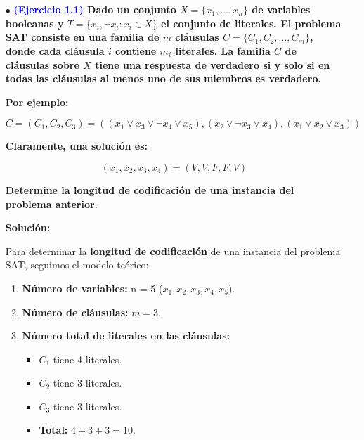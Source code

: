 \documentclass[12pt]{article}
\begin{document}
\section{}
{
    \subsection{}
    {

        \begin{enumerate}
            \item[$\bullet$]\textbf{\textcolor{blue}{(Ejercicio 1.1)} Dado un conjunto $X = \{x_1, \dots, x_n\}$ de variables booleanas y $T = \{x_i, \neg x_i : x_i \in X\}$ el conjunto de literales.  
            El problema SAT consiste en una familia de $m$ cláusulas $C = \{C_1, C_2, \dots, C_m\}$, donde cada cláusula $i$ contiene $m_i$ literales.  
            La familia $C$ de cláusulas sobre $X$ tiene una respuesta de verdadero si y solo si en todas las cláusulas al menos uno de sus miembros es verdadero.}
            
            \textbf{Por ejemplo: }

                \[
                    C = (C_1, C_2, C_3) = ((x_1 \lor x_3 \lor \neg x_4 \lor x_5), (x_2 \lor \neg x_3 \lor x_4), (x_1 \lor x_2 \lor x_3))
                \]

            \textbf{Claramente, una solución es:}
                
                \[
                (x_1, x_2, x_3, x_4) = (V, V, F, F, V)
                \]
                
            \textbf{Determine la longitud de codificación de una instancia del problema anterior.}

            \textbf{Solución: }
            {

                Para determinar la \textbf{longitud de codificación} de una instancia del problema SAT, seguimos el modelo teórico:

                \begin{enumerate}
                    \item \textbf{Número de variables:} n = 5 ($x_1, x_2, x_3, x_4, x_5$).
                    \item \textbf{Número de cláusulas:} $m = 3$.
                    \item \textbf{Número total de literales en las cláusulas:}
                    \begin{itemize}
                        \item $C_1$ tiene 4 literales.
                        \item $C_2$ tiene 3 literales.
                        \item $C_3$ tiene 3 literales.
                        \item \textbf{Total:} $4 + 3 + 3 = 10$.
                    \end{itemize}
                \end{enumerate}
                
}
\end{enumerate}}}
\end{document}
